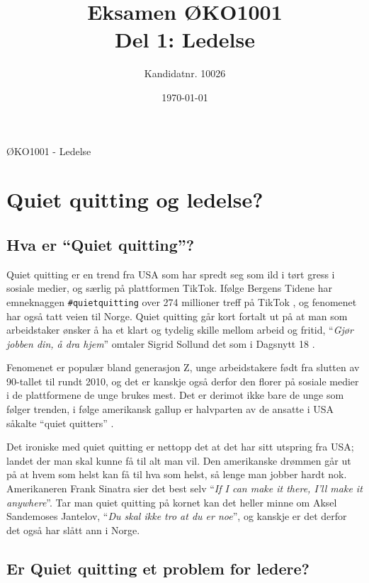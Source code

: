 \documentclass[a4paper, 12pt]{article}  %
\title{Eksamen ØKO1001\\Del 1: Ledelse} %
\author{Kandidatnr. 10026}              %
\date{\today}                           %
\begin{document}
\maketitle
\vfill
\begin{center}
  ØKO1001 - Ledelse
\end{center}
\thispagestyle{empty}
\addtocounter{page}{-1}
\newpage
\tableofcontents %
\thispagestyle{empty}
\addtocounter{page}{-1}
\newpage
\section{Quiet quitting og ledelse?}

\subsection{Hva er ``Quiet quitting''?}

Quiet quitting er en trend fra USA som har spredt seg som ild i tørt gress i sosiale medier, og særlig på plattformen TikTok. 
Ifølge Bergens Tidene har emneknaggen \texttt{\#quietquitting} over 274 millioner treff på TikTok \parencite{bt22}, og fenomenet har også tatt veien til Norge. 
Quiet quitting går kort fortalt ut på at man som arbeidstaker ønsker å ha et klart og tydelig skille mellom arbeid og fritid, 
``\emph{Gjør jobben din, å dra hjem}'' omtaler Sigrid Sollund det som i Dagsnytt 18 \parencite{dax18}.

Fenomenet er populær bland generasjon Z, unge arbeidstakere født fra slutten av 90-tallet til rundt 2010, 
og det er kanskje også derfor den florer på sosiale medier i de plattformene de unge brukes mest.
Det er derimot ikke bare de unge som følger trenden, i følge amerikansk gallup er halvparten av de ansatte i USA såkalte ``quiet quitters'' \parencite{dax18}.

Det ironiske med quiet quitting er nettopp det at det har sitt utspring fra USA; landet der man skal kunne få til alt man vil. 
Den amerikanske drømmen går ut på at hvem som helst kan få til hva som helst, så lenge man jobber hardt nok. 
Amerikaneren Frank Sinatra sier det best selv ``\emph{If I can make it there, I'll make it anywhere}''. 
Tar man quiet quitting på kornet kan det heller minne om Aksel Sandemoses Jantelov, ``\emph{Du skal ikke tro at du \emph{er} noe}'', og kanskje er det derfor det også har slått ann i Norge.

\subsection{Er Quiet quitting et problem for ledere?}
\end{document}
